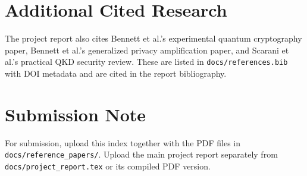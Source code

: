 \documentclass[11pt,a4paper]{article}
\begin{document}
\section*{Additional Cited Research}
The project report also cites Bennett et al.'s experimental quantum cryptography paper, Bennett et al.'s generalized privacy amplification paper, and Scarani et al.'s practical QKD security review. These are listed in \texttt{docs/references.bib} with DOI metadata and are cited in the report bibliography.

\section*{Submission Note}
For submission, upload this index together with the PDF files in \texttt{docs/reference\_papers/}. Upload the main project report separately from \texttt{docs/project\_report.tex} or its compiled PDF version.
\end{document}
